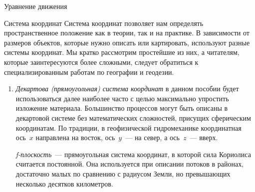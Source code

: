\begin{chapter}{Уравнение движения}
\begin{section}{Система координат}
Система координат позволяет нам определять пространственное положение как 
в теории, так и на практике. В зависимости от размеров объектов,
которые нужно описать или картировать, используют разные системы
координат. Мы кратко рассмотрим простейшие из них, а читателям, которые 
заинтересуются более сложными, следует обратиться к специализированным работам 
по географии и геодезии.
%

\begin{enumerate}
\item
\emph{Декартова (прямоугольная) система координат} в данном пособии
будет использоваться далее наиболее часто с целью максимально упростить 
изложение материала. Большинство процессов могут быть описаны в декартовой 
системе без математических сложностей, присущих сферическим координатам. 
По традиции, в геофизической гидромеханике координатная ось~$x$ направлена 
на восток, ось~$y$~--- на север, а ось~$z$~--- вверх.
%

\emph{f-плоскость}~--- прямоугольная система координат, в которой
сила Кориолиса считается постоянной. Она используется при описании
потоков в районах, достаточно малых по сравнению с радиусом Земли,
но превышающих несколько десятков километров.
%


\end{enumerate}
\end{section}
\end{chapter}
